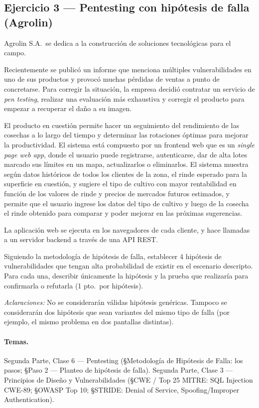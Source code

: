 \subsection{Ejercicio 3 --- Pentesting con hipótesis de falla (Agrolin)}

\begin{consigna}
Agrolin S.A.\ se dedica a la construcción de soluciones tecnológicas para el campo.

Recientemente se publicó un informe que menciona múltiples vulnerabilidades en uno de sus
productos y provocó muchas pérdidas de ventas a punto de concretarse. Para corregir la
situación, la empresa decidió contratar un servicio de \emph{pen testing}, realizar una
evaluación más exhaustiva y corregir el producto para empezar a recuperar el daño a su
imagen.

El producto en cuestión permite hacer un seguimiento del rendimiento de las cosechas a lo
largo del tiempo y determinar las rotaciones óptimas para mejorar la productividad. El
sistema está compuesto por un frontend web que es un \emph{single page web app}, donde el
usuario puede registrarse, autenticarse, dar de alta lotes marcado sus límites en un mapa,
actualizarlos o eliminarlos. El sistema muestra según datos históricos de todos los clientes
de la zona, el rinde esperado para la superficie en cuestión, y sugiere el tipo de cultivo
con mayor rentabilidad en función de los valores de rinde y precios de mercados futuros
estimados, y permite que el usuario ingrese los datos del tipo de cultivo y luego de la
cosecha el rinde obtenido para comparar y poder mejorar en las próximas sugerencias.

La aplicación web se ejecuta en los navegadores de cada cliente, y hace llamadas a un
servidor backend a través de una API REST.

Siguiendo la metodología de hipótesis de falla, establecer 4 hipótesis de vulnerabilidades
que tengan alta probabilidad de existir en el escenario descripto. Para cada una, describir
únicamente la hipótesis y la prueba que realizaría para confirmarla o refutarla (1 pto.\ por
hipótesis).

\emph{Aclaraciones:} No se considerarán válidas hipótesis genéricas. Tampoco se considerarán
dos hipótesis que sean variantes del mismo tipo de falla (por ejemplo, el mismo problema en
dos pantallas distintas).
\end{consigna}

\paragraph{Temas.}
Segunda Parte, Clase 6 --- Pentesting (\S Metodología de Hipótesis de Falla: los pasos;
\S Paso 2 --- Planteo de hipótesis de falla). Segunda Parte, Clase 3 --- Principios de
Diseño y Vulnerabilidades (\S CWE / Top 25 MITRE: SQL Injection CWE-89; \S OWASP Top 10;
\S STRIDE: Denial of Service, Spoofing/Improper Authentication).

